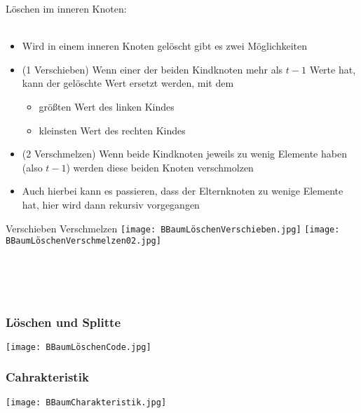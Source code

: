 			\noindent Löschen im inneren Knoten: \\ \\
			\begin{minipage}{0.6\textwidth}
				\begin{itemize}
					\item Wird in einem inneren Knoten gelöscht gibt es zwei Möglichkeiten
					\item (1 Verschieben) Wenn einer der beiden Kindknoten mehr als $t-1$ Werte hat,
						kann der gelöschte Wert ersetzt werden, mit dem
						\begin{itemize}
							\item grö\ss ten Wert des linken Kindes
							\item kleinsten Wert des rechten Kindes
						\end{itemize}
					\item (2 Verschmelzen) Wenn beide Kindknoten jeweils zu wenig Elemente
						haben (also $t-1$) werden diese beiden Knoten verschmolzen
					\item Auch hierbei kann es passieren, dass der Elternknoten zu wenige Elemente 
						hat, hier wird dann rekursiv vorgegangen

				\end{itemize}
			\end{minipage}
			\hspace{0.5cm}
			\begin{minipage}{0.35\textwidth}
				\begin{center}
					Verschieben \hspace{1cm} Verschmelzen
					\texttt{[image: BBaumLöschenVerschieben.jpg]}
					\texttt{[image: BBaumLöschenVerschmelzen02.jpg]}
				\end{center}
			\end{minipage}
			\mbox{} \\ \\ \\
		

		\begin{minipage}[t]{0.5\textwidth}
			\subsubsection{Löschen und Splitte}
				\begin{center}
					\texttt{[image: BBaumLöschenCode.jpg]}
				\end{center}
		\end{minipage}
		\begin{minipage}[t]{0.45\textwidth}
			\subsubsection{Cahrakteristik}
				\begin{center}
					\texttt{[image: BBaumCharakteristik.jpg]}
				\end{center}
		\end{minipage}


